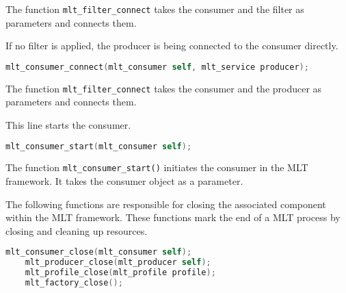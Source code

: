 \documentclass[../MasterThesis.tex]{subfiles}
\begin{document}
\begin{description}[font=\color{RedViolet!80!black}, style=nextline]
	The function \texttt{mlt\_filter\_connect} takes the consumer and the filter as parameters and connects them.
	
	
	If no filter is applied, the producer is being connected to the consumer directly.
	
	\begin{lstlisting}[language=C, numbers=none, columns=fullflexible, belowskip=0pt, aboveskip=9pt]
	mlt_consumer_connect(mlt_consumer self,	mlt_service producer); \end{lstlisting}
	
	The function \texttt{mlt\_filter\_connect} takes the consumer and the producer as parameters and connects them.
	
	
	\item[Start consumer] 
	
	This line starts the consumer.
	
	\begin{lstlisting}[language=C, numbers=none, columns=fullflexible, belowskip=0pt, aboveskip=9pt]
	mlt_consumer_start(mlt_consumer self);	\end{lstlisting}

	The function \texttt{mlt\_consumer\_start()} initiates the consumer in the MLT framework. It takes the consumer object as a parameter. 
	
	
	
	
	
	\item[Close the components]
	
	The following functions are responsible for closing the associated component within the MLT framework. These functions mark the end of a MLT process by closing and cleaning up resources.
	
	\begin{lstlisting}[language=C, numbers=none, columns=fullflexible, belowskip=0pt, aboveskip=9pt]
	mlt_consumer_close(mlt_consumer self); 
	mlt_producer_close(mlt_producer self); 
	mlt_profile_close(mlt_profile profile); 
	mlt_factory_close();\end{lstlisting}
	
	
\end{description}










\end{document}
